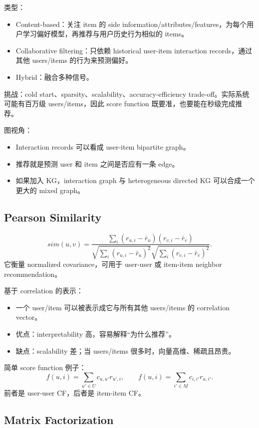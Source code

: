 \documentclass[UTF8,11pt,a4paper]{ctexart}
\begin{document}
类型：
\begin{itemize}
\item Content-based：关注 item 的 side information/attributes/features，为每个用户学习偏好模型，再推荐与用户历史行为相似的 items。
\item Collaborative filtering：只依赖 historical user-item interaction records，通过其他 users/items 的行为来预测偏好。
\item Hybrid：融合多种信号。
\end{itemize}
挑战：cold start、sparsity、scalability、accuracy-efficiency trade-off。实际系统可能有百万级 users/items，因此 score function 既要准，也要能在秒级完成推荐。

图视角：
\begin{itemize}
\item Interaction records 可以看成 user-item bipartite graph。
\item 推荐就是预测 user 和 item 之间是否应有一条 edge。
\item 如果加入 KG，interaction graph 与 heterogeneous directed KG 可以合成一个更大的 mixed graph。
\end{itemize}

\subsection{Pearson Similarity}

\[
sim(u,v)=
\frac{\sum_i(r_{u,i}-\bar r_u)(r_{v,i}-\bar r_v)}
{\sqrt{\sum_i(r_{u,i}-\bar r_u)^2}\sqrt{\sum_i(r_{v,i}-\bar r_v)^2}}.
\]
它衡量 normalized covariance，可用于 user-user 或 item-item neighbor recommendation。

基于 correlation 的表示：
\begin{itemize}
\item 一个 user/item 可以被表示成它与所有其他 users/items 的 correlation vector。
\item 优点：interpretability 高，容易解释“为什么推荐”。
\item 缺点：scalability 差；当 users/items 很多时，向量高维、稀疏且昂贵。
\end{itemize}

简单 score function 例子：
\[
f(u,i)=\sum_{u'\in U}c_{u,u'}r_{u',i},
\qquad
f(u,i)=\sum_{i'\in M}c_{i,i'}r_{u,i'}.
\]
前者是 user-user CF，后者是 item-item CF。

\subsection{Matrix Factorization}
\end{document}

